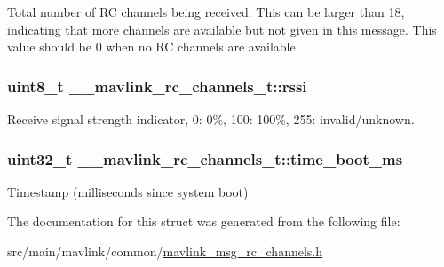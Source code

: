 Total number of R\+C channels being received. This can be larger than 18, indicating that more channels are available but not given in this message. This value should be 0 when no R\+C channels are available. 

\hypertarget{struct____mavlink__rc__channels__t_abe7cb3691d12fff362b8758802b4b85b}{
\subsubsection[{rssi}]{\setlength{\rightskip}{0pt plus 5cm}uint8\+\_\+t \+\_\+\+\_\+mavlink\+\_\+rc\+\_\+channels\+\_\+t\+::rssi}}\label{struct____mavlink__rc__channels__t_abe7cb3691d12fff362b8758802b4b85b}


Receive signal strength indicator, 0\+: 0\%, 100\+: 100\%, 255\+: invalid/unknown. 

\hypertarget{struct____mavlink__rc__channels__t_ab33b6c744bb0806ebe7ceb28795efe2e}{
\subsubsection[{time\+\_\+boot\+\_\+ms}]{\setlength{\rightskip}{0pt plus 5cm}uint32\+\_\+t \+\_\+\+\_\+mavlink\+\_\+rc\+\_\+channels\+\_\+t\+::time\+\_\+boot\+\_\+ms}}\label{struct____mavlink__rc__channels__t_ab33b6c744bb0806ebe7ceb28795efe2e}


Timestamp (milliseconds since system boot) 



The documentation for this struct was generated from the following file\+:\begin{DoxyCompactItemize}
\item 
src/main/mavlink/common/\hyperlink{mavlink__msg__rc__channels_8h}{mavlink\+\_\+msg\+\_\+rc\+\_\+channels.\+h}\end{DoxyCompactItemize}
